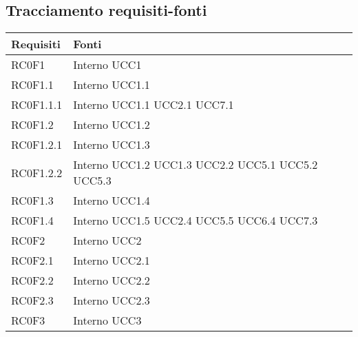 \subsection{Tracciamento requisiti-fonti}
\begin{center}
\bgroup
\def\arraystretch{1.8}
\begin{longtable}{|p{5cm}|p{5cm}|} \hline
\textbf{Requisiti} & \textbf{Fonti} \\\hline
RC0F1		& Interno \newline UCC1 \\\hline
RC0F1.1		& Interno \newline UCC1.1 \\\hline
RC0F1.1.1	& Interno \newline UCC1.1 \newline UCC2.1 \newline UCC7.1 \\\hline
RC0F1.2		& Interno \newline UCC1.2 \\\hline
RC0F1.2.1	& Interno \newline UCC1.3 \\\hline
RC0F1.2.2	& Interno \newline UCC1.2 \newline UCC1.3 \newline UCC2.2 \newline UCC5.1 \newline UCC5.2 \newline UCC5.3 \\\hline
RC0F1.3		& Interno \newline UCC1.4 \\\hline
RC0F1.4		& Interno \newline UCC1.5 \newline UCC2.4 \newline UCC5.5 \newline UCC6.4 \newline UCC7.3 \\\hline
RC0F2		& Interno \newline UCC2 \\\hline
RC0F2.1		& Interno \newline UCC2.1 \\\hline
RC0F2.2		& Interno \newline UCC2.2 \\\hline
RC0F2.3		& Interno \newline UCC2.3 \\\hline
RC0F3		& Interno \newline UCC3 \\\hline

\end{longtable}
\end{center}
